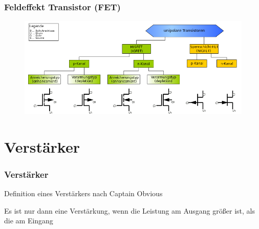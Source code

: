 \begin{frame}
\frametitle{Feldeffekt Transistor (FET)}
\begin{center}
	\begin{figure}
      \includegraphics[width=\textwidth,height=.65\textheight,keepaspectratio]{e13/FET-overview.png}
    \end{figure}
\end{center}
\end{frame}

\section{Verstärker}
\begin{frame}
\frametitle{Verstärker}
\begin{center}
\begin{block}{Definition eines Verstärkers nach Captain Obvious}
  \begin{Large}
    Es ist nur dann eine Verstärkung, wenn die Leistung am Ausgang größer ist, als die am Eingang
  \end{Large}
\end{block}
\end{center}
\end{frame}

